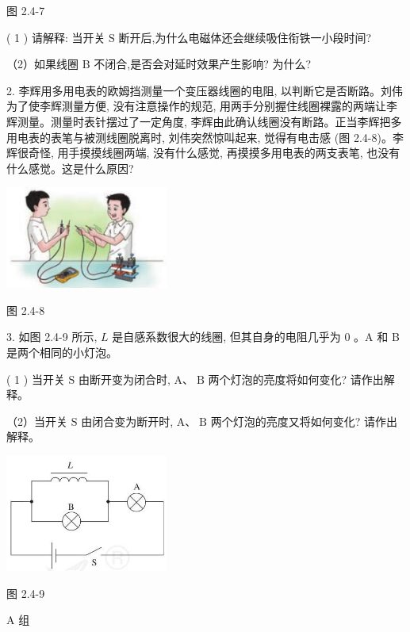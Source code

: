 \documentclass[10pt]{article}
\begin{document}
图 2.4-7

( 1 ) 请解释: 当开关 \(\mathrm{S}\) 断开后,为什么电磁体还会继续吸住衔铁一小段时间?

（2）如果线圈 \(\mathrm{B}\) 不闭合,是否会对延时效果产生影响? 为什么?

2. 李辉用多用电表的欧姆挡测量一个变压器线圈的电阻, 以判断它是否断路。刘伟为了使李辉测量方便, 没有注意操作的规范, 用两手分别握住线圈裸露的两端让李辉测量。测量时表针摆过了一定角度, 李辉由此确认线圈没有断路。正当李辉把多用电表的表笔与被测线圈脱离时, 刘伟突然惊叫起来, 觉得有电击感 (图 2.4-8)。李辉很奇怪, 用手摸摸线圈两端, 没有什么感觉, 再摸摸多用电表的两支表笔, 也没有什么感觉。这是什么原因?

\begin{center}
\includegraphics[max width=0.4\textwidth]{images/01910e72-c5b7-7ed5-a6d4-fb3a5faefc32_49_540627.jpg}
\end{center}

图 2.4-8

3. 如图 2.4-9 所示, \(L\) 是自感系数很大的线圈, 但其自身的电阻几乎为 0 。A 和 B 是两个相同的小灯泡。

( 1 ) 当开关 \(\mathrm{S}\) 由断开变为闭合时, \(\mathrm{A}\text{、}\mathrm{\;B}\) 两个灯泡的亮度将如何变化? 请作出解释。

（2）当开关 \(\mathrm{S}\) 由闭合变为断开时, \(\mathrm{A}\text{、}\mathrm{\;B}\) 两个灯泡的亮度又将如何变化? 请作出解释。

\begin{center}
\includegraphics[max width=0.4\textwidth]{images/01910e72-c5b7-7ed5-a6d4-fb3a5faefc32_49_162819.jpg}
\end{center}

图 2.4-9

A 组
\end{document}
